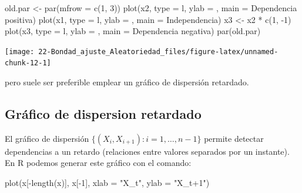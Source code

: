 \documentclass[
  10pt,
]{book}
\newenvironment{Shaded}{\begin{snugshade}}{\end{snugshade}}
\newcommand{\AttributeTok}[1]{\textcolor[rgb]{0.77,0.63,0.00}{#1}}
\newcommand{\DecValTok}[1]{\textcolor[rgb]{0.00,0.00,0.81}{#1}}
\newcommand{\FunctionTok}[1]{\textcolor[rgb]{0.00,0.00,0.00}{#1}}
\newcommand{\NormalTok}[1]{#1}
\newcommand{\OtherTok}[1]{\textcolor[rgb]{0.56,0.35,0.01}{#1}}
\newcommand{\SpecialCharTok}[1]{\textcolor[rgb]{0.00,0.00,0.00}{#1}}
\newcommand{\StringTok}[1]{\textcolor[rgb]{0.31,0.60,0.02}{#1}}
\theoremstyle{break}
\theoremstyle{nonumberplain}
\begin{document}
\begin{Shaded}
\begin{Highlighting}[]
\NormalTok{old.par }\OtherTok{\textless{}{-}} \FunctionTok{par}\NormalTok{(}\AttributeTok{mfrow =} \FunctionTok{c}\NormalTok{(}\DecValTok{1}\NormalTok{, }\DecValTok{3}\NormalTok{))}
\FunctionTok{plot}\NormalTok{(x2, }\AttributeTok{type =} \StringTok{\textquotesingle{}l\textquotesingle{}}\NormalTok{, }\AttributeTok{ylab =} \StringTok{\textquotesingle{}\textquotesingle{}}\NormalTok{, }\AttributeTok{main =} \StringTok{\textquotesingle{}Dependencia positiva\textquotesingle{}}\NormalTok{)}
\FunctionTok{plot}\NormalTok{(x1, }\AttributeTok{type =} \StringTok{\textquotesingle{}l\textquotesingle{}}\NormalTok{, }\AttributeTok{ylab =} \StringTok{\textquotesingle{}\textquotesingle{}}\NormalTok{, }\AttributeTok{main =} \StringTok{\textquotesingle{}Independencia\textquotesingle{}}\NormalTok{)}
\NormalTok{x3 }\OtherTok{\textless{}{-}}\NormalTok{ x2 }\SpecialCharTok{*} \FunctionTok{c}\NormalTok{(}\DecValTok{1}\NormalTok{, }\SpecialCharTok{{-}}\DecValTok{1}\NormalTok{)}
\FunctionTok{plot}\NormalTok{(x3, }\AttributeTok{type =} \StringTok{\textquotesingle{}l\textquotesingle{}}\NormalTok{, }\AttributeTok{ylab =} \StringTok{\textquotesingle{}\textquotesingle{}}\NormalTok{, }\AttributeTok{main =} \StringTok{\textquotesingle{}Dependencia negativa\textquotesingle{}}\NormalTok{)}
\FunctionTok{par}\NormalTok{(old.par)}
\end{Highlighting}
\end{Shaded}

\begin{center}\texttt{[image: 22-Bondad\_ajuste\_Aleatoriedad\_files/figure-latex/unnamed-chunk-12-1]} \end{center}

pero suele ser preferible emplear un gráfico de dispersión retardado.

\hypertarget{gruxe1fico-de-dispersion-retardado}{%
\subsection{Gráfico de dispersion retardado}\label{gruxe1fico-de-dispersion-retardado}}

El gráfico de dispersión \(\{(X_{i},X_{i+1}) : i = 1, \ldots, n-1 \}\) permite
detectar dependencias a un retardo (relaciones entre valores separados
por un instante).
En R podemos generar este gráfico con el comando:

\begin{Shaded}
\begin{Highlighting}[]
\FunctionTok{plot}\NormalTok{(x[}\SpecialCharTok{{-}}\FunctionTok{length}\NormalTok{(x)], x[}\SpecialCharTok{{-}}\DecValTok{1}\NormalTok{], }\AttributeTok{xlab =} \StringTok{"X\_t"}\NormalTok{, }\AttributeTok{ylab =} \StringTok{"X\_t+1"}\NormalTok{)}
\end{Highlighting}
\end{Shaded}
\end{document}
